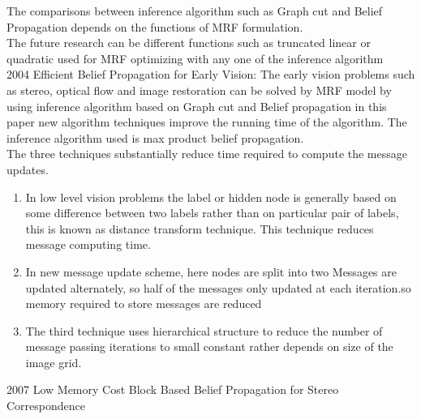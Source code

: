 The comparisons between inference algorithm such as Graph cut and Belief Propagation depends on the functions of MRF formulation.\\
The future research can be different functions such as truncated linear or quadratic used for MRF optimizing with any one of the inference algorithm\\
2004 Efficient Belief Propagation for Early Vision:
The early vision problems such as stereo, optical flow and image restoration can be solved by MRF model by using inference algorithm based on Graph cut and Belief propagation in this paper new algorithm techniques improve the running time of the algorithm.
The inference algorithm used is max product belief propagation.\\
The three techniques substantially reduce time required to compute the message updates.
\begin{enumerate}
  \item {In low level vision problems the label or hidden node is generally based on some difference between two labels rather than on particular pair of labels, this is known as distance transform technique. This technique reduces message computing time.}

  \item {In new message update scheme, here nodes are split into two
Messages are updated alternately, so half of the messages only updated at each iteration.so memory required to store messages are reduced}
  \item {The third technique uses hierarchical structure to reduce the number of message passing iterations to small constant rather depends on size of the image grid.}
\end{enumerate}


2007  Low Memory Cost Block Based Belief Propagation for Stereo Correspondence

